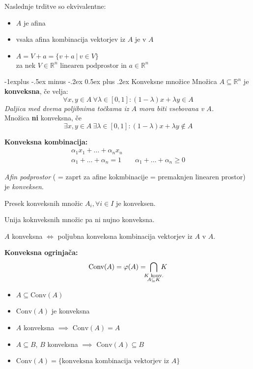\documentclass[a4paper,8pt]{extarticle}
\makeatletter
\renewcommand{\subsection}{\@startsection{subsection}{2}{0mm}%
                                {-1explus -.5ex minus -.2ex}%
                                {0.5ex plus .2ex}%
                                {\normalfont\normalsize\bfseries}}
\makeatother
\begin{document}
\begin{multicols}{4}
Naslednje trditve so ekvivalentne:
\begin{itemize}
	\item $A$ je afina
	\item vsaka afina kombinacija vektorjev iz $A$ je v $A$
	\item $A = V + a = \{ v + a\ |\ v \in V \}$\\ za nek $ V \in \mathbb{R}^n \text{ linearen podprostor}$ in $a \in \mathbb{R}^n$
\end{itemize}

\subsection{Konveksne množice}
Množica $A \subseteq \mathbb{R}^n $ je \textbf{konveksna}, če velja:
\[ \forall x,y \in A \ \forall \lambda \in [0,1] : (1-\lambda)x + \lambda y \in A \]
\emph{Daljica med dvema poljibnima točkama iz $A$ mora biti vsebovana v $A$.}\\

Množica \textbf{ni} konveksna, če
\[\exists x,y \in A \ \exists \lambda \in [0, 1]: (1-\lambda)x + \lambda y \notin A \]

\textbf{Konveksna kombinacija:}
\begin{gather*}
	\alpha_1 x_1 + \dots + \alpha_n x_n \\
	\alpha_1 + \dots + \alpha_n = 1 \qquad \alpha_1 + \dots + \alpha_n \geq 0 
\end{gather*}

\emph{Afin podprostor} ( = zaprt za afine kokmbinacije = premaknjen linearen prostor) je \emph{konveksen}.

Presek konveksnih množic $A_i, \forall i\in I$ je konveksen.

Unija koknveksnih množic pa ni nujno konveksna.

$A$ konveksna $\iff$ poljubna konveksna kombinacija vektorjev iz $A$ v $A$.

\textbf{Konveksna ogrinjača:} 
\begin{align*}
	\text{Conv}(A) = \varphi(A) =\ \bigcap_{\mathclap{\substack{K \text{ konv.}\\ A \subseteq K}}}\ K
\end{align*}
\begin{itemize}
	\item $A \subseteq \text{Conv}(A)$
	\item $\text{Conv}(A)$ je konveksna
	\item $A$ konveksna $\implies$ $\text{Conv}(A) = A$
	\item $A \subseteq B$, $B$ konveksna $\implies$ $\text{Conv}(A) \subseteq B$
	\item $\text{Conv}(A) = \{\text{konveksna kombinacija vektorjev iz $A$}\}$
\end{itemize}


\end{multicols}
\end{document}
